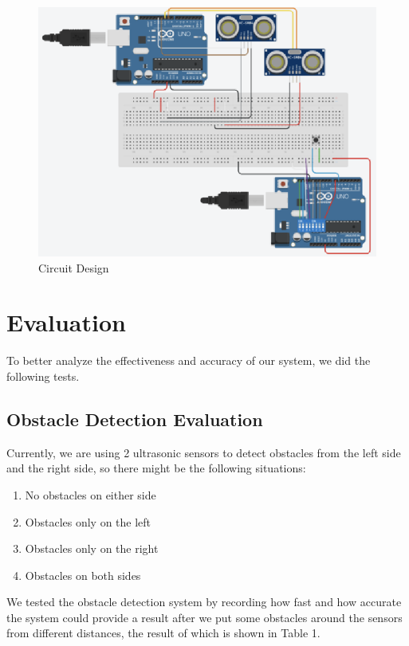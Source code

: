 \begin{figure}
  \includegraphics{circuit}
  \caption{Circuit Design}
\end{figure}


\section{Evaluation}
To better analyze the effectiveness and accuracy of our system, we did the following tests.

\subsection{Obstacle Detection Evaluation}
Currently, we are using 2 ultrasonic sensors to detect obstacles from the left side and the right side, so there might be the following situations:

\begin{enumerate}
  \item No obstacles on either side
  \item Obstacles only on the left
  \item Obstacles only on the right
  \item Obstacles on both sides
\end{enumerate}

We tested the obstacle detection system by recording how fast and how accurate the system could provide a result after we put some obstacles around the sensors from different distances, the result of which is shown in Table 1.

